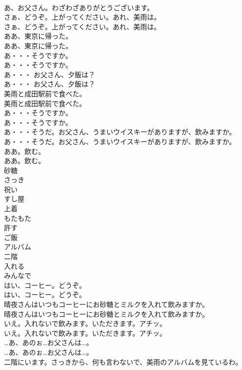 \documentclass[8pt]{extreport}
\begin{document}
\begin{CJK}{UTF8}{min}
\\	あ、お父さん。わざわざありがとうございます。 
\\	さぁ、どうぞ。上がってください。あれ、美雨は。	
\\	さぁ、どうぞ。上がってください。あれ、美雨は。 
\\	ああ、東京に帰った。	
\\	ああ、東京に帰った。 
\\	あ・・・そうですか。	
\\	あ・・・そうですか。 
\\	あ・・・ お父さん、夕飯は？	
\\	あ・・・ お父さん、夕飯は？ 
\\	美雨と成田駅前で食べた。	
\\	美雨と成田駅前で食べた。 
\\	あ・・・そうですか。	
\\	あ・・・そうですか。 
\\	あ・・・そうだ。お父さん、うまいウイスキーがありますが、飲みますか。	
\\	あ・・・そうだ。お父さん、うまいウイスキーがありますが、飲みますか。 
\\	ああ。飲む。	
\\	ああ。飲む。 
\\	砂糖
\\	さっき
\\	祝い
\\	すし屋
\\	上着
\\	もたもた
\\	許す
\\	ご飯
\\	アルバム
\\	二階
\\	入れる
\\	みんなで
\\	はい、コーヒー。どうぞ。	
\\	はい、コーヒー。どうぞ。 
\\	晴夜さんはいつもコーヒーにお砂糖とミルクを入れて飲みますか。	
\\	晴夜さんはいつもコーヒーにお砂糖とミルクを入れて飲みますか。 
\\	いえ。入れないで飲みます。いただきます。アチッ。	
\\	いえ。入れないで飲みます。いただきます。アチッ。 
\\	…あ、あのぉ…お父さんは…。	
\\	…あ、あのぉ…お父さんは…。 
\\	二階にいます。さっきから、何も言わないで、美雨のアルバムを見ているわ。	

\end{CJK}
\end{document}
